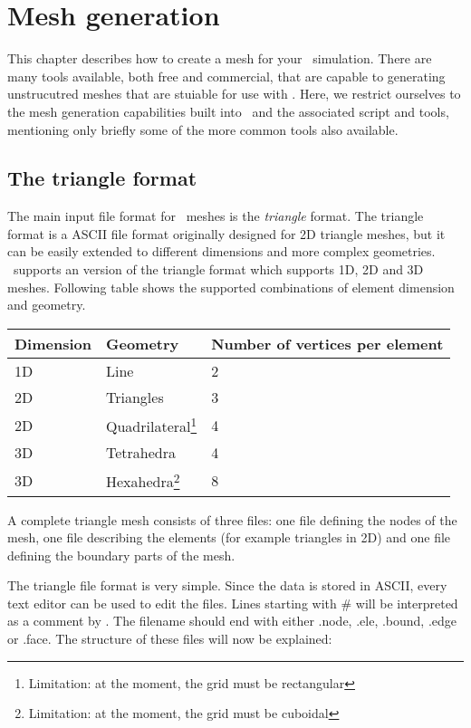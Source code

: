 \chapter{Mesh generation}\label{chap:meshes}

This chapter describes how to create a mesh for your \fluidity\ simulation. There
are many tools available, both free and commercial, that are capable to generating
unstrucutred meshes that are stuiable for use with \fluidity. Here, we restrict ourselves
to the mesh generation capabilities built into \fluidity\ and the associated script and
tools, mentioning only briefly some of the more common tools also available.


\section{The triangle format}\label{sect:triangle_format}

The main input file format for \fluidity\ meshes is the \emph{triangle} format.
The triangle format is a ASCII file format originally designed for 2D
triangle meshes, but it can be easily extended to different dimensions and
more complex geometries.  \fluidity\ supports an version of the triangle format
which supports 1D, 2D and 3D meshes.  Following table shows the supported
combinations of element dimension and geometry.

\begin{tabular}{ l l l }
\textbf{Dimension} & \textbf{Geometry} & \textbf{Number of vertices per element} \\ \hline
1D & Line & 2\\ 
2D & Triangles &  3 \\ 
2D & Quadrilateral\footnote{Limitation: at the moment, the grid must be rectangular} & 4 \\
3D & Tetrahedra & 4 \\ 
3D & Hexahedra\footnote{Limitation: at the moment, the grid must be cuboidal} & 8 \\
\end{tabular}

A complete triangle mesh consists of three files: one file defining the
nodes of the mesh, one file describing the elements (for example triangles
in 2D) and one file defining the boundary parts of the mesh.

The triangle file format is very simple. Since the data is stored in ASCII,
every text editor can be used to edit the files.  Lines starting with \# will
be interpreted as a comment by \fluidity.  The filename should end with
either .node, .ele, .bound, .edge or .face.  The structure of these files
will now be explained:

